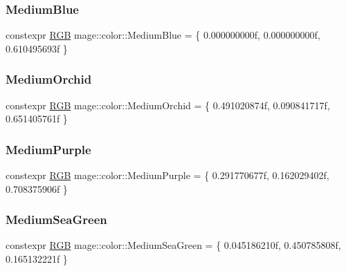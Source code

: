 \subsubsection{\texorpdfstring{Medium\+Blue}{MediumBlue}}
{\footnotesize\ttfamily constexpr \hyperlink{structmage_1_1_r_g_b}{R\+GB} mage\+::color\+::\+Medium\+Blue = \{ 0.\+000000000f, 0.\+000000000f, 0.\+610495693f \}}

\hypertarget{namespacemage_1_1color_a55306d3a39ad61219538ba4527521342}{}\label{namespacemage_1_1color_a55306d3a39ad61219538ba4527521342} 
\subsubsection{\texorpdfstring{Medium\+Orchid}{MediumOrchid}}
{\footnotesize\ttfamily constexpr \hyperlink{structmage_1_1_r_g_b}{R\+GB} mage\+::color\+::\+Medium\+Orchid = \{ 0.\+491020874f, 0.\+090841717f, 0.\+651405761f \}}

\hypertarget{namespacemage_1_1color_a05a317af5ced870161013504175e18b8}{}\label{namespacemage_1_1color_a05a317af5ced870161013504175e18b8} 
\subsubsection{\texorpdfstring{Medium\+Purple}{MediumPurple}}
{\footnotesize\ttfamily constexpr \hyperlink{structmage_1_1_r_g_b}{R\+GB} mage\+::color\+::\+Medium\+Purple = \{ 0.\+291770677f, 0.\+162029402f, 0.\+708375906f \}}

\hypertarget{namespacemage_1_1color_a28991b5b9e22fa71e7554d315741da6c}{}\label{namespacemage_1_1color_a28991b5b9e22fa71e7554d315741da6c} 
\subsubsection{\texorpdfstring{Medium\+Sea\+Green}{MediumSeaGreen}}
{\footnotesize\ttfamily constexpr \hyperlink{structmage_1_1_r_g_b}{R\+GB} mage\+::color\+::\+Medium\+Sea\+Green = \{ 0.\+045186210f, 0.\+450785808f, 0.\+165132221f \}}

\hypertarget{namespacemage_1_1color_ac985e8c0e60c1a407ebb8190318e5f26}{}\label{namespacemage_1_1color_ac985e8c0e60c1a407ebb8190318e5f26} 
